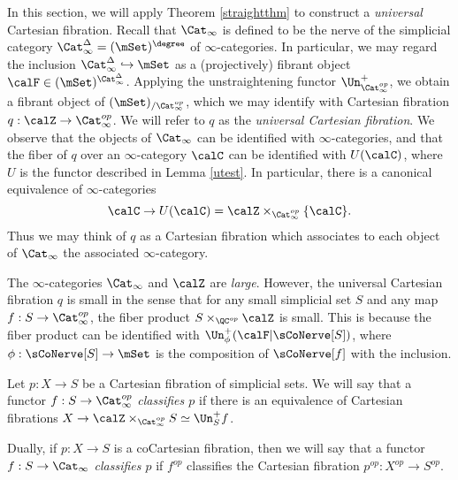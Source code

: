 In this section, we will apply Theorem \ref{straightthm} to construct a {\em universal} Cartesian fibration. Recall that $\Cat_{\infty}$ is defined to be the nerve of the simplicial category
$\Cat_{\infty}^{\Delta} = ( \mSet)^{\degree}$ of $\infty$-categories. In particular, we may regard the inclusion $\Cat_{\infty}^{\Delta} \hookrightarrow \mSet$ as a (projectively) fibrant object 
$\calF \in (\mSet)^{ \Cat_{\infty}^{\Delta} }$. Applying the unstraightening functor
$\Un^{+}_{\Cat_{\infty}^{op}}$, we obtain a fibrant object of $(\mSet)_{/\Cat_{\infty}^{op}}$, which we may identify with Cartesian fibration $q: \calZ \rightarrow \Cat_{\infty}^{op}$. We will refer to $q$
as the {\it universal Cartesian fibration}. We observe that the objects of $\Cat_{\infty}$ can be identified with $\infty$-categories, and that the fiber of $q$ over an $\infty$-category $\calC$ can be identified with $U(\calC)$, where $U$ is the functor described in Lemma \ref{utest}. In particular, there is a canonical equivalence of $\infty$-categories $$\calC \rightarrow U(\calC) =
\calZ \times_{ \Cat_{\infty}^{op} } \{ \calC \}.$$ Thus we may think of $q$ as a Cartesian fibration which associates to each object of $\Cat_{\infty}$ the associated $\infty$-category.

\begin{remark}
The $\infty$-categories $\Cat_{\infty}$ and $\calZ$ are {\em large}. However, the universal Cartesian fibration $q$ is small in the sense that for any small simplicial set $S$ and any map $f: S \rightarrow \Cat_{\infty}^{op}$, the fiber product $S \times_{ \QC^{op}} \calZ$ is small. This is because the fiber product can be identified with $\Un^{+}_{\phi}(\calF| \sCoNerve[S])$, where $\phi: \sCoNerve[S] \rightarrow \mSet$ is the composition of $\sCoNerve[f]$ with the inclusion.
\end{remark}

\begin{definition}\label{classer}
Let $p: X \rightarrow S$ be a Cartesian fibration of simplicial sets. We will say that
a functor $f: S \rightarrow \Cat_{\infty}^{op}$ {\it classifies $p$} if there is an equivalence of Cartesian fibrations $X \rightarrow \calZ \times_{ \Cat^{op}_{\infty}} S
\simeq \Un^{+}_{S} f$. 

Dually, if $p: X \rightarrow S$ is a coCartesian fibration, then we will say that a functor
$f: S \rightarrow \Cat_{\infty}$ {\it classifies $p$} if $f^{op}$ classifies the
Cartesian fibration $p^{op}: X^{op} \rightarrow S^{op}$.
\end{definition}

